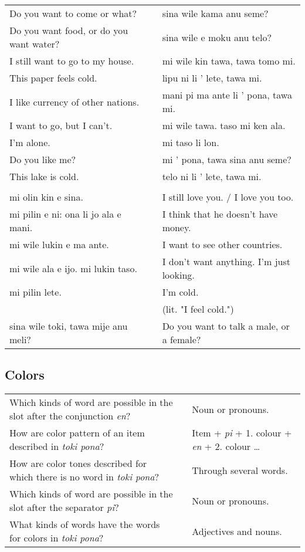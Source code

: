 \begin{supertabular}{p{5,5cm}|ll}
Do you want to come or what?  && sina wile kama anu seme? \\ %
Do you want food, or do you want water?  && sina wile e moku anu telo? \\ %
I still want to go to my house.  && mi wile kin tawa, tawa tomo mi. \\ %
This paper feels cold.  && lipu ni li ' lete, tawa mi. \\ %
I like currency of other nations.  && mani pi ma ante li ' pona, tawa mi. \\ %
I want to go, but I can't.  && mi wile tawa. taso mi ken ala. \\ %
I'm alone.  && mi taso li lon. \\ %
Do you like me?  && mi ' pona, tawa sina anu seme? \\ %
This lake is cold. && telo ni li ' lete, tawa mi. \\ %
 && \\ %
mi olin kin e sina.  && I still love you. / I love you too.\\
mi pilin e ni: ona li jo ala e mani.  && I think that he doesn't have money. \\
mi wile lukin e ma ante.  && I want to see other countries. \\
mi wile ala e ijo. mi lukin taso.  && I don't want anything. I'm just looking. \\
mi pilin lete.  && I'm cold. \\
 &&   (lit. "I feel cold.") \\ %
sina wile toki, tawa mije anu meli?  && Do you want to talk a male, or a female? \\
\end{supertabular} 
\newpage
\subsection*{Colors} 
\label{'colors'}
%
\begin{supertabular}{p{5,5cm}|ll}
Which kinds of word are possible in the slot after the conjunction \textit{en}? && Noun or pronouns.  \\ %
How are color pattern of an item described in \textit{toki pona}? && Item + \textit{pi} + 1. colour + \textit{en} + 2. colour \dots \\ %
How are color tones described for which there is no word in \textit{toki pona}? && Through several words. \\ %
Which kinds of word are possible in the slot after the separator \textit{pi}? && Noun or pronouns.  \\ %
What kinds of words have the words for colors in \textit{toki pona}? && Adjectives and nouns. \\ %
\end{supertabular} 


